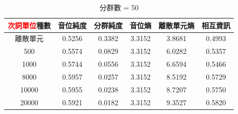     {
        \begin{table}[!htbp]
            \centering

            \begin{subtable}[t]{\textwidth}
                \centering
                \begin{tabular}{|c|c|c|c|c|c|} \hline
                    \textcolor{red}{次詞單位}種數 & 音位純度   & 分群純度   & 音位熵    & 離散單元熵  & 相互資訊   \\ \hline
                                         離散單元 &     0.5256 &     0.3382 &    3.3152 &      3.8681 &     0.4993 \\ \hline
                                             500  &     0.5574 &     0.0829 &    3.3152 &      6.0282 &     0.5357 \\ \hline %
                                            1000  &     0.5744 &     0.0556 &    3.3152 &      6.6594 &     0.5466 \\ \hline %
                                            8000  &     0.5957 &     0.0257 &    3.3152 &      8.5192 &     0.5729 \\ \hline %
                                           10000  &     0.5955 &     0.0238 &    3.3152 &      8.7207 &     0.5750 \\ \hline %
                                           20000  &     0.5921 &     0.0182 &    3.3152 &      9.3527 &     0.5820 \\ \hline %
                \end{tabular}
                \caption{分群數 = 50}
                \label{tab:ch4-hubert-phn-clu050-}
            \end{subtable}

            \vspace{0.5cm}
            

\end{table}}
